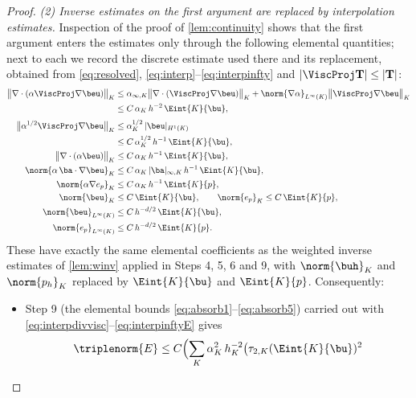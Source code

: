\begin{proof}
\smallskip\noindent\emph{(2) Inverse estimates on the first argument are replaced by
interpolation estimates.}
Inspection of the proof of \cref{lem:continuity} shows that the first argument enters the
estimates only through the following elemental quantities; next to each we record the
discrete estimate used there and its replacement, obtained from \eqref{eq:resolved},
\eqref{eq:interp}--\eqref{eq:interpinfty} and
$|\ViscProj\mathbf{T}|\le|\mathbf{T}|$:
\begin{align}
  \bigl\lVert\nabla\cdot(\alpha\ViscProj\nabla\beu)\bigr\rVert_K
  &\le \alpha_{\infty,K}\bigl\lVert\nabla\cdot(\ViscProj\nabla\beu)\bigr\rVert_K
   + \norm{\nabla\alpha}_{L^\infty(K)}\bigl\lVert\ViscProj\nabla\beu\bigr\rVert_K \\
  &\le C\,\alpha_K\,h^{-2}\,\Eint{K}{\bu},
  \label{eq:interpdivvisc}\\[2pt]
  \bigl\lVert\alpha^{1/2}\ViscProj\nabla\beu\bigr\rVert_K
  &\le \alpha_K^{1/2}\,|\beu|_{H^1(K)} \\
  &\le C\,\alpha_K^{1/2}\,h^{-1}\,\Eint{K}{\bu},
  \label{eq:interpgrad}\\
  \bigl\lVert\nabla\cdot(\alpha\beu)\bigr\rVert_K
  &\le C\,\alpha_K\,h^{-1}\,\Eint{K}{\bu}, \\
   \norm{\alpha\,\ba\cdot\nabla\beu}_K
   &\le C\,\alpha_K\,|\ba|_{\infty,K}\,h^{-1}\,\Eint{K}{\bu},
  \label{eq:interpfirst}\\
  \norm{\alpha\nabla e_p}_K
  &\le C\,\alpha_K\,h^{-1}\,\Eint{K}{p}, \\
   \norm{\beu}_K &\le C\,\Eint{K}{\bu},
  \qquad
   \norm{e_p}_K \le C\,\Eint{K}{p},
  \label{eq:interpzero}\\
  \norm{\beu}_{L^\infty(K)}
  &\le C\,h^{-d/2}\,\Eint{K}{\bu}, \\
  \norm{e_p}_{L^\infty(K)} &\le C\,h^{-d/2}\,\Eint{K}{p}.
  \label{eq:interpinftyE}
\end{align}
These have exactly the same elemental coefficients as the weighted inverse estimates of
\cref{lem:winv} applied in Steps 4, 5, 6 and 9, with $\norm{\buh}_K$ and $\norm{p_h}_K$
replaced by $\Eint{K}{\bu}$ and $\Eint{K}{p}$. Consequently:
\begin{itemize}[leftmargin=2em]
\item Step 9 (the elemental bounds \eqref{eq:absorb1}--\eqref{eq:absorb5}) carried out
with \eqref{eq:interpdivvisc}--\eqref{eq:interpinftyE} gives
\begin{equation}\label{eq:Enorm}
  \triplenorm{E}
  \le C\Bigl(\sum_{K}\alpha_K^2\,h_K^{-2}\bigl(\tau_{2,K}(\Eint{K}{\bu})^2

\end{equation}
\end{itemize}
\end{proof}
